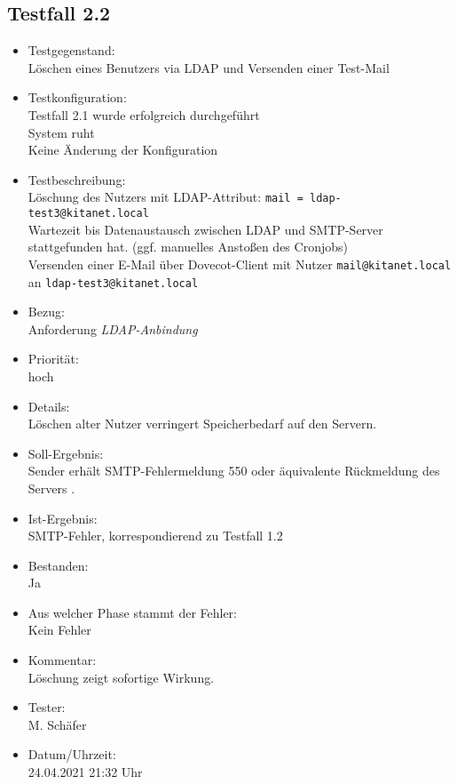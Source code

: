 \subsection{Testfall 2.2}
\begin{itemize}
	\item Testgegenstand:\\
Löschen eines Benutzers via LDAP und Versenden einer Test-Mail
	\item Testkonfiguration:\\
	Testfall 2.1 wurde erfolgreich durchgeführt\\
	System ruht\\
	Keine Änderung der Konfiguration
	\item Testbeschreibung:\\
	Löschung des Nutzers mit LDAP-Attribut: \verb+mail = ldap-test3@kitanet.local+\\
	Wartezeit bis Datenaustausch zwischen LDAP und SMTP-Server stattgefunden hat. (ggf. manuelles Anstoßen des Cronjobs)\\
	Versenden einer E-Mail über Dovecot-Client mit Nutzer \verb+mail@kitanet.local+ \\ an \verb+ldap-test3@kitanet.local+
	\item Bezug:\\
	Anforderung \textit{LDAP-Anbindung}
	\item Priorität:\\
	hoch
	\item Details:\\
	Löschen alter Nutzer verringert Speicherbedarf auf den Servern.
	\item Soll-Ergebnis:\\
	Sender erhält SMTP-Fehlermeldung 550 oder äquivalente Rückmeldung des Servers \citep[vgl.][16]{rfc821}.
	\item Ist-Ergebnis:\\
	SMTP-Fehler, korrespondierend zu Testfall 1.2
	\item Bestanden:\\
	Ja
	\item Aus welcher Phase stammt der Fehler:\\
	Kein Fehler
	\item Kommentar:\\
	Löschung zeigt sofortige Wirkung. 
	\item Tester:\\
	M. Schäfer
	\item Datum/Uhrzeit:\\
	24.04.2021 21:32 Uhr
\end{itemize}



